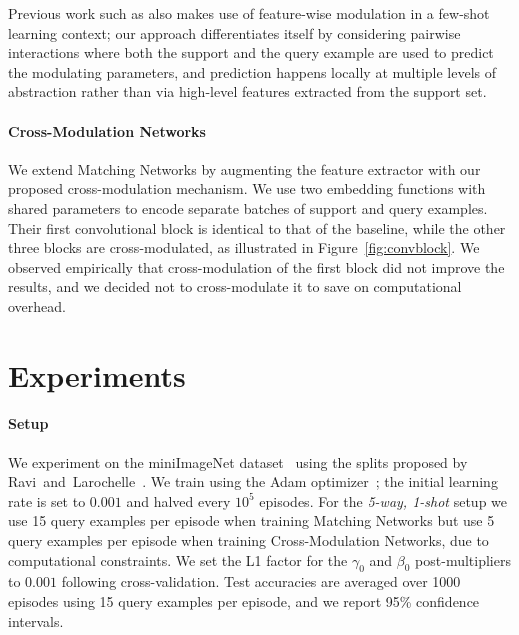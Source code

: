 \documentclass{article}
\begin{document}
Previous work such as \cite{oreshkin18tadam,munkhdalai17condshift} also makes
use of feature-wise modulation in a few-shot learning context; our approach
differentiates itself by considering pairwise interactions where both the support
and the query example are used to predict the modulating parameters, and
prediction happens locally at multiple levels of abstraction rather than via
high-level features extracted from the support set.


\paragraph{Cross-Modulation Networks}

We extend Matching Networks by augmenting the feature extractor with
our proposed cross-modulation mechanism. We use two embedding
functions with shared parameters to encode separate batches of support
and query examples. Their first convolutional block is identical to
that of the baseline, while the other three blocks are
cross-modulated, as illustrated in Figure~\ref{fig:convblock}. We
observed empirically that cross-modulation of the first block did not
improve the results, and we decided not to cross-modulate it to save
on computational overhead.


\section{Experiments}
\label{sec:experiments}

\paragraph{Setup} We experiment on the miniImageNet
dataset~\cite{vinyals2016matching} using the splits proposed
by Ravi~and~Larochelle~\cite{ravi2017optim}. We train using the Adam
optimizer~\cite{kingma14adam}; the initial learning rate is set to $0.001$
and halved every $10^5$ episodes. For the {\em 5-way, 1-shot}
setup we use 15 query examples per episode when training Matching
Networks but use 5 query examples per episode when training Cross-Modulation
Networks, due to computational constraints. We set the L1 factor for
the $\gamma_0$ and $\beta_0$ post-multipliers to $0.001$ following
cross-validation. Test accuracies are averaged over 1000 episodes using
15 query examples per episode, and we report 95\% confidence intervals.
\end{document}
